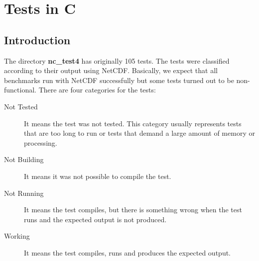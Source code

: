 \chapter{Tests in C}
\label{ch:nctests}

\section{Introduction}

The directory \textbf{nc\_test4} has originally 105 tests. The tests were classified according to their output using NetCDF. Basically, we expect that all benchmarks run with NetCDF successfully but some tests turned out to be non-functional.
There are four categories for the tests:

\begin{description}

\item[Not Tested] It means the test was not tested. This category usually represents tests that are too long to run or tests that demand a large amount of memory or processing.

\item[Not Building] It means it was not possible to compile the test.

\item[Not Running] It means the test compiles, but there is something wrong when the test runs and the expected output is not produced.

\item[Working] It means the test compiles, runs and produces the expected output.

\end{description}


